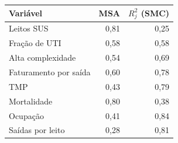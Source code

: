 \begin{tabular}{lrr}
\toprule
Variável & MSA & $R^2_j$ (SMC) \\
\midrule
Leitos SUS & 0,81 & 0,25 \\
Fração de UTI & 0,58 & 0,58 \\
Alta complexidade & 0,54 & 0,69 \\
Faturamento por saída & 0,60 & 0,78 \\
TMP & 0,43 & 0,79 \\
Mortalidade & 0,80 & 0,38 \\
Ocupação & 0,41 & 0,84 \\
Saídas por leito & 0,28 & 0,81 \\
\bottomrule
\end{tabular}
